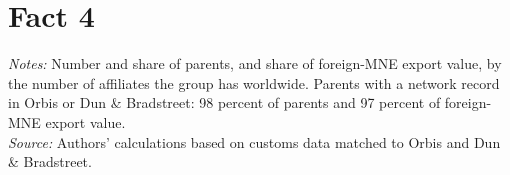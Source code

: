 \documentclass[11pt,a4paper]{article}
\begin{document}
\section*{Fact 4}%
\begin{table}[H]\centering\small%
  \caption{Foreign-Multinational Exports and Number of Parents, by Size of the Group's Global Network}%
  \label{tab:a_f5_tab}%
  \par\vspace{3pt}%
  \begin{minipage}{0.95\textwidth}\footnotesize %
  \textit{Notes:} Number and share of parents, and share of foreign-MNE export value, by the number of affiliates the group has worldwide. Parents with a network record in Orbis or Dun \& Bradstreet: 98 percent of parents and 97 percent of foreign-MNE export value.\\[3pt]%
  \textit{Source:} Authors' calculations based on customs data matched to Orbis and Dun \& Bradstreet.%
  \end{minipage}%
  \end{table}
\end{document}
